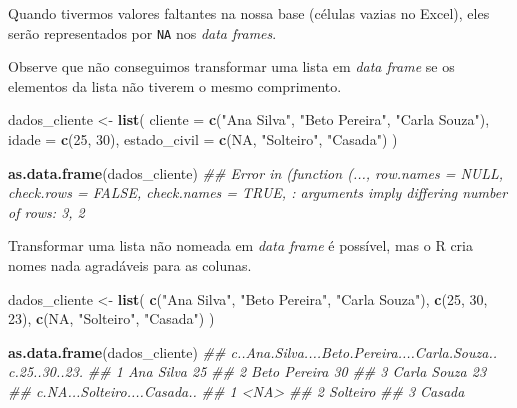 \documentclass[]{book}
\newenvironment{Shaded}{\begin{snugshade}}{\end{snugshade}}
\newcommand{\CommentTok}[1]{\textcolor[rgb]{0.56,0.35,0.01}{\textit{#1}}}
\newcommand{\DataTypeTok}[1]{\textcolor[rgb]{0.13,0.29,0.53}{#1}}
\newcommand{\DecValTok}[1]{\textcolor[rgb]{0.00,0.00,0.81}{#1}}
\newcommand{\KeywordTok}[1]{\textcolor[rgb]{0.13,0.29,0.53}{\textbf{#1}}}
\newcommand{\NormalTok}[1]{#1}
\newcommand{\OtherTok}[1]{\textcolor[rgb]{0.56,0.35,0.01}{#1}}
\newcommand{\StringTok}[1]{\textcolor[rgb]{0.31,0.60,0.02}{#1}}
\begin{document}
Quando tivermos valores faltantes na nossa base (células vazias no Excel), eles serão representados por \texttt{NA} nos \emph{data frames}.

Observe que não conseguimos transformar uma lista em \emph{data frame} se os elementos da lista não tiverem o mesmo comprimento.

\begin{Shaded}
\begin{Highlighting}[]
\NormalTok{dados_cliente <-}\StringTok{ }\KeywordTok{list}\NormalTok{(}
  \DataTypeTok{cliente =} \KeywordTok{c}\NormalTok{(}\StringTok{"Ana Silva"}\NormalTok{, }\StringTok{"Beto Pereira"}\NormalTok{, }\StringTok{"Carla Souza"}\NormalTok{),}
  \DataTypeTok{idade =} \KeywordTok{c}\NormalTok{(}\DecValTok{25}\NormalTok{, }\DecValTok{30}\NormalTok{),}
  \DataTypeTok{estado_civil =} \KeywordTok{c}\NormalTok{(}\OtherTok{NA}\NormalTok{, }\StringTok{"Solteiro"}\NormalTok{, }\StringTok{"Casada"}\NormalTok{)}
\NormalTok{)}

\KeywordTok{as.data.frame}\NormalTok{(dados_cliente)}
\CommentTok{## Error in (function (..., row.names = NULL, check.rows = FALSE, check.names = TRUE, : arguments imply differing number of rows: 3, 2}
\end{Highlighting}
\end{Shaded}

Transformar uma lista não nomeada em \emph{data frame} é possível, mas o R cria nomes nada agradáveis para as colunas.

\begin{Shaded}
\begin{Highlighting}[]
\NormalTok{dados_cliente <-}\StringTok{ }\KeywordTok{list}\NormalTok{(}
  \KeywordTok{c}\NormalTok{(}\StringTok{"Ana Silva"}\NormalTok{, }\StringTok{"Beto Pereira"}\NormalTok{, }\StringTok{"Carla Souza"}\NormalTok{),}
  \KeywordTok{c}\NormalTok{(}\DecValTok{25}\NormalTok{, }\DecValTok{30}\NormalTok{, }\DecValTok{23}\NormalTok{),}
  \KeywordTok{c}\NormalTok{(}\OtherTok{NA}\NormalTok{, }\StringTok{"Solteiro"}\NormalTok{, }\StringTok{"Casada"}\NormalTok{)}
\NormalTok{)}

\KeywordTok{as.data.frame}\NormalTok{(dados_cliente)}
\CommentTok{##   c..Ana.Silva....Beto.Pereira....Carla.Souza.. c.25..30..23.}
\CommentTok{## 1                                     Ana Silva            25}
\CommentTok{## 2                                  Beto Pereira            30}
\CommentTok{## 3                                   Carla Souza            23}
\CommentTok{##   c.NA...Solteiro....Casada..}
\CommentTok{## 1                        <NA>}
\CommentTok{## 2                    Solteiro}
\CommentTok{## 3                      Casada}
\end{Highlighting}
\end{Shaded}
\end{document}
